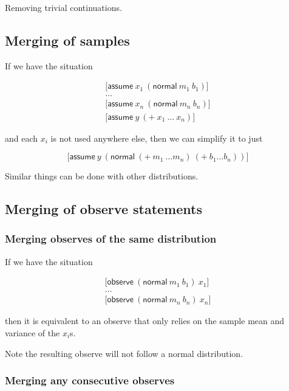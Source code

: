 \documentclass[a4paper]{article}
\begin{document}
Removing trivial continuations.



\subsection{Merging of samples}

If we have the situation

\[
	\begin{array}{l}
		\lbrack \mathsf{assume}\ x_1\ (\mathsf{normal}\ m_1\ b_1) \rbrack \\
		\dots \\
		\lbrack \mathsf{assume}\ x_n\ (\mathsf{normal}\ m_n\ b_n) \rbrack \\
		\lbrack \mathsf{assume}\ y\ (+\ x_1\ ...\ x_n) \rbrack
	\end{array}
\]

and each \(x_i\) is not used anywhere else, then we can simplify it to just

\[\lbrack \mathsf{assume}\ y\ (\mathsf{normal}\ (+\ m_1\ \dots m_n)\ (+\ b_1 \dots b_n)) \rbrack\]

Similar things can be done with other distributions.



\subsection{Merging of observe statements}

\subsubsection{Merging observes of the same distribution}

If we have the situation

\[
	\begin{array}{l}
		\lbrack \mathsf{observe}\ (\mathsf{normal}\ m_1\ b_1)\ x_1 \rbrack \\
		\dots \\
		\lbrack \mathsf{observe}\ (\mathsf{normal}\ m_n\ b_n)\ x_n \rbrack
	\end{array}
\]

then it is equivalent to an observe that only relies on the sample mean and variance of the \(x_i\)s.

Note the resulting observe will not follow a normal distribution.



\subsubsection{Merging any consecutive observes}
\end{document}
